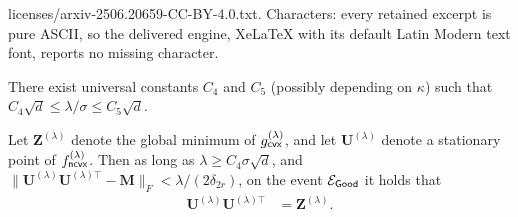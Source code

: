 \documentclass[10pt,a4paper]{amsart}
\begin{document}
licenses/arxiv-2506.20659-CC-BY-4.0.txt. Characters: every retained excerpt is pure ASCII, so the delivered engine, XeLaTeX with its default Latin Modern text font, reports no missing character.
\begin{assumption} \label{ass3}
    There exist universal constants $C_4$ and $C_5$ (possibly depending on $\kappa$) such that $C_4\sqrt{d} \leq \lambda/\sigma \leq C_5 \sqrt{d}$.  
\end{assumption}

\begin{lemma} \label{lem:relatecvxncvx}
    Let $\bm{Z}^{(\lambda)}$ denote the global minimum of $g^{(\lambda)}_{{\sf cvx}}$, and let $\bm{U}^{(\lambda)}$ denote a stationary point of $f^{(\lambda)}_{{\sf ncvx}}$.  Then as long as $\lambda \geq C_4 \sigma \sqrt{d}$, and $ \| \bm{U}^{(\lambda)}\bm{U}^{(\lambda)\top} - \bm{M} \|_F < \lambda/(2\delta_{2r})$,     on the event $\mathcal{E}_{{\sf Good}}$ it holds that
    \begin{align}
        \bm{U}^{(\lambda)} \bm{ U}^{(\lambda)\top} &= \bm{Z}^{(\lambda)}.
    \end{align}
\end{lemma}
\end{document}
